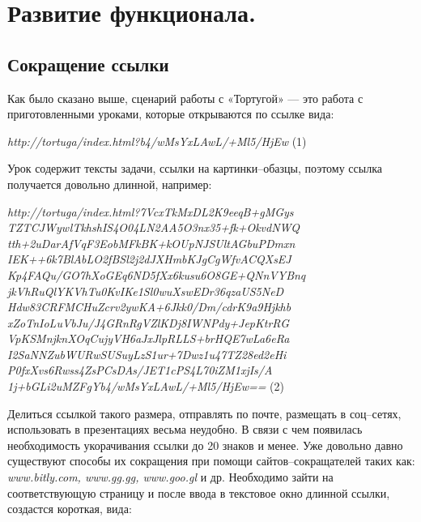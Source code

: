 \chapter{Развитие функционала.} \label{chapt2}

\section{Сокращение ссылки} \label{sect1_1}

Как было сказано выше, сценарий работы с «Тортугой» --- это работа с приготовленными уроками, которые открываются по ссылке вида: \par
\vspace{6mm}
\begin{center}
 \textit{ http://tortuga/index.html?b4/wMsYxLAwL/+Ml5/HjEw } (1)\par

\end{center}
\vspace{6mm}

Урок содержит тексты задачи, ссылки на картинки–обазцы, поэтому ссылка получается довольно длинной, например: \par

\begin{center}
\vspace{6mm}
 \textit{ http://tortuga/index.html?7VcxTkMxDL2K9eeqB+gMGys
 TZTCJWywlTkhshIS4O04LN2AA5O3nx35+fk+OkvdNWQ
 tth+2uDarAfVqF3EobMFkBK+kOUpNJSUltAGbuPDmxn
 IEK++6k7BlAbLO2fBSl2j2dJXHmbKJgCgWfvACQXsEJ
 Kp4FAQu/GO7hXoGEq6ND5fXx6kusu6O8GE+QNnVYBnq
 jkVhRuQlYKVhTu0KvIKe1Sl0wuXswEDr36qzaUS5NeD
 Hdw83CRFMCHuZcrv2ywKA+6Jkk0/Dm/cdrK9a9Hjkhb
 xZoTnIoLuVbJu/J4GRnRgVZlKDj8IWNPdy+JepKtrRG
 VpKSMnjknXOqCujyVH6aJxJlpRLLS+brHQE7wLa6eRa
 I2SaNNZubWURwSUSuyLzS1ur+7Dwz1u47TZ28ed2eHi
 P0fxXvs6Rwss4ZsPCsDAs/JET1cPS4L70iZM1xjIs/A
 1j+bGLi2uMZFgYb4/wMsYxLAwL/+Ml5/HjEw== } (2)\par
\end{center}

\vspace{6mm}

Делиться ссылкой такого размера, отправлять по почте, размещать в соц–сетях, использовать в презентациях весьма неудобно. В связи с чем появилась необходимость укорачивания ссылки до 20 знаков и менее. Уже довольно давно существуют способы их сокращения при помощи сайтов–сокращателей таких как:  \textit{www.bitly.com, www.gg.gg, www.goo.gl} и др. Необходимо зайти на соответствующую страницу и после ввода в текстовое окно длинной ссылки, создастся короткая, вида:
 
